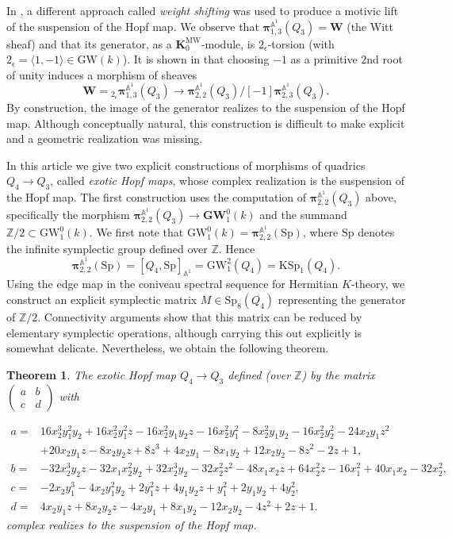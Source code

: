\documentclass[11pt,leqno]{article}
\newcommand{\Z}{{\mathbb Z}}
\newcommand{\aone}{{\mathbb A}^1}
\renewcommand{\1}{{\rm 1\hspace*{-0.4ex}%
\rule{0.1ex}{1.52ex}\hspace*{0.2ex}}}
\newcommand{\MW}{\mathrm{MW}}
\newcommand{\bpi}{\bm{\pi}}
\newcommand{\piaone}{{\bpi}^{\aone}}
\newcommand{\KMW}[1]{{{\mathbf K}_{#1}^{\MW}}}
\newcommand{\<}[1]{{\langle}#1 {\rangle}}
\newcounter{intro}
\theoremstyle{plain}
\newtheorem{thmintro}{Theorem}
\theoremstyle{definition}
\theoremstyle{remark}
\numberwithin{equation}{section}
\begin{document}
In \cite{Asok20b}, a different approach called \emph{weight shifting} was used to produce a motivic lift of the suspension of the Hopf map. We observe that $\piaone_{1,3}(Q_3)=\mathbf{W}$ (the Witt sheaf) and that its generator, as a $\KMW 0$-module, is $2_{\epsilon}$-torsion (with $2_{\epsilon}=\langle 1,-1\rangle\in \mathrm{GW}(k)$). It is shown in \cite[Theorem 2.1.11]{Asok20b} that choosing $-1$ as a primitive $2$nd root of unity induces a morphism of sheaves
\[
\mathbf{W}={}_{2_\epsilon}\piaone_{1,3}(Q_3)\to \piaone_{2,2}(Q_3)/[-1]\piaone_{2,3}(Q_3).
\]
By construction, the image of the generator realizes to the suspension of the Hopf map. Although conceptually natural, this construction is difficult to make explicit and a geometric realization was missing.

In this article we give two explicit constructions of morphisms of quadrics $Q_4\to Q_3$, called \emph{exotic Hopf maps}, whose complex realization is the suspension of the Hopf map. The first construction uses the computation of $\piaone_{2,2}(Q_3)$ above, specifically the morphism $\piaone_{2,2}(Q_3)\to \mathbf{GW}_1^0(k)$ and the summand $\Z/2\subset \mathrm{GW}_1^0(k)$. We first note that $\mathrm{GW}_1^0(k)=\piaone_{2,2}(\mathrm{Sp})$, where $\mathrm{Sp}$ denotes the infinite symplectic group defined over $\Z$. Hence
\[
\piaone_{2,2}(\mathrm{Sp})=[Q_4,\mathrm{Sp}]_{\aone}=\mathrm{GW}_1^2(Q_4)=\mathrm{KSp}_1(Q_4).
\]
Using the edge map in the coniveau spectral sequence for Hermitian $K$-theory, we construct an explicit symplectic matrix $M\in \mathrm{Sp}_8(Q_4)$ representing the generator of $\Z/2$. Connectivity arguments show that this matrix can be reduced by elementary symplectic operations, although carrying this out explicitly is somewhat delicate. Nevertheless, we obtain the following theorem.

\begin{thmintro}
The exotic Hopf map $Q_4\to Q_3$ defined (over $\Z$) by the matrix $\begin{pmatrix}
a & b \\ c & d
\end{pmatrix}$ with

\begin{align*}
a =& 16x_2^3y_1^2y_2+16x_2^2y_1^2z-16x_2^2y_1y_2z-16x_2^2y_1^2-8x_2^2y_1y_2-16x_2^2y_2^2-24x_2y_1z^2 \\ &+20x_2y_1z-8x_2y_2z+8z^3+4x_2y_1-8x_1y_2+12x_2y_2-8z^2-2z+1, \\
b =& -32x_2^3y_2z-32x_1x_2^2y_2+32x_2^3y_2-32x_2^2z^2-48x_1x_2z+64x_2^2z-16x_1^2+40x_1x_2-32x_2^2, \\
c =& -2x_2y_1^3-4x_2y_1^2y_2+2y_1^2z+4y_1y_2z+y_1^2+2y_1y_2+4y_2^2, \\
d =& 4x_2y_1z+8x_2y_2z-4x_2y_1+8x_1y_2-12x_2y_2-4z^2+2z+1.
\end{align*}
complex realizes to the suspension of the Hopf map.
\end{thmintro}
\end{document}
